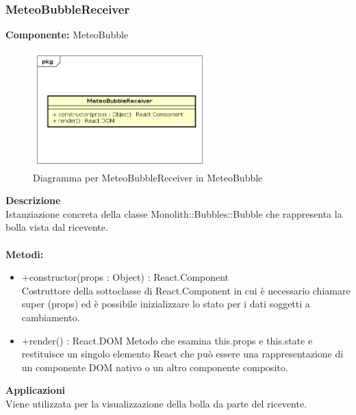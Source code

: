 \clearpage

\subsubsection{MeteoBubbleReceiver}
\textbf{Componente:}  MeteoBubble\\
   \FloatBarrier
   \begin{figure}[ht]
   \centering
   \includegraphics[width=0.6\textwidth]{img/single-MeteoBubbleReceiver}
   \caption{{Diagramma per MeteoBubbleReceiver in MeteoBubble}}
\end{figure}
\FloatBarrier
\textbf{Descrizione}\\
Istanziazione concreta della classe Monolith::Bubbles::Bubble che rappresenta la bolla vista dal ricevente.
\\
\\
\textbf{Metodi:} 
\begin{itemize}
\item +constructor(props : Object) : React.Component 
\\
Costruttore della sottoclasse di React.Component in cui è necessario chiamare super (props) ed è possibile inizializzare lo stato per i dati soggetti a cambiamento.

\item +render() : React.DOM
Metodo che esamina this.props e this.state e restituisce un singolo elemento React che può essere una rappresentazione di un componente DOM nativo o un altro componente composito.

\end{itemize} 


\textbf{Applicazioni}\\
Viene utilizzata per la visualizzazione della bolla da parte del ricevente. 


\clearpage

